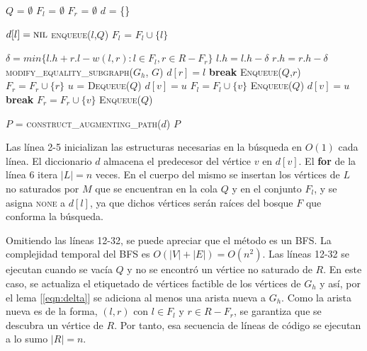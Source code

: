 \documentclass[10pt]{article} %
\begin{document}
	\vspace{1em}
	\begin{algorithmic}[1]
		\State $Q$ = $\emptyset$
		\State $F_l$ = $\emptyset$
		\State $F_r$ = $\emptyset$
		\State $d$ = \{\}
		
		\State $d[l] = \textsc{nil}$
		\State \textsc{enqueue($l$,$Q$)}
		\State $F_l$ = $F_l \cup \{l\}$
		
		\EndFor
		
		\Repeat
		\State $\delta = min\{l.h + r.l - w(l,r): l\in F_l, r \in R-F_r\}$ 
		\State $l.h = l.h -\delta$
		\EndFor
		\State $r.h = r.h -\delta$
		\EndFor
		\State \textsc{modify\_equality\_subgraph($G_h$, $G$)}
		\State $d[r] = l $
		\State \textbf{break}
		\Else
		\State \textsc{Enqueue($Q$,$r$)}
		\State $F_r = F_r \cup \{r\}$
		\EndIf
		\EndIf
		\EndFor
		\EndIf
		\State $u$ = \textsc{Dequeue($Q$)}
		\State $d[v] = u$
		\State $F_l = F_l \cup \{v\}$
		\State \textsc{Enqueue($Q$)}
		\EndIf
		\EndFor	
		\Else 
		\State $d[v] = u$
		\State \textbf{break}
		\Else						
		\State $F_r = F_r \cup \{v\}$
		\State \textsc{Enqueue($Q$)}
		\EndIf
		\EndIf
		
		\EndFor	
		
		\EndIf
		
		\State $P$ = \textsc{construct\_augmenting\_path($d$)}
		\State \Return $P$
		\EndFunction 
	\end{algorithmic}
	\vspace{1em}
	
	Las l\'inea 2-5 inicializan las estructuras necesarias en la b\'usqueda en $O(1)$ cada l\'inea. El diccionario $d$ almacena el predecesor del v\'ertice $v$ en $d[v]$. El \textbf{for} de la l\'inea 6 itera $|L|=n$ veces. En el cuerpo del mismo se insertan los v\'ertices de $L$ no saturados por $M$ que se encuentran en la cola $Q$ y en el conjunto $F_l$, y se asigna \textsc{none} a $d[l]$, ya que dichos v\'ertices ser\'an ra\'ices del bosque $F$ que conforma la b\'usqueda.
	
	Omitiendo las l\'ineas 12-32, se puede apreciar que el m\'etodo es un BFS. La complejidad temporal del BFS es $O(|V| + |E|) = O(n^2)$. Las l\'ineas 12-32 se ejecutan cuando se vac\'ia $Q$ y no se encontr\'o un v\'ertice no saturado de $R$. En este caso, se actualiza el etiquetado de v\'ertices factible de los v\'ertices de $G_h$ y as\'i, por el lema [\ref{eqn:delta}] se adiciona al menos una arista nueva a $G_h$. Como la arista nueva es de la forma, $(l,r)$ con $l\in F_l$ y $r \in R-F_r$, se garantiza que se descubra un v\'ertice de $R$. Por tanto, esa secuencia de l\'ineas de c\'odigo se ejecutan a lo sumo $|R|=n$.
	
\end{document}
